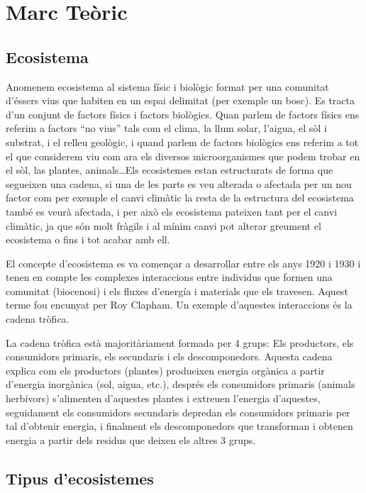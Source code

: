 \section{Marc Teòric}

\subsection{Ecosistema}
Anomenem ecosistema al sistema físic i biològic format per una comunitat d’éssers vius que habiten en un espai delimitat (per exemple un bosc). Es tracta d’un conjunt de factors físics i factors biològics. Quan parlem de factors físics ens referim a factors ``no vius'' tals com el clima, la llum solar, l’aigua, el sòl i substrat, i el relleu geològic, i quand parlem de factors biològics ens referim a tot el que considerem viu com ara els diversos microorganismes que podem trobar en el sòl, las plantes, animals\dots Els ecosistemes estan estructurats de forma que segueixen una cadena, si una de les parts es veu alterada o afectada per un nou factor com per exemple el canvi climàtic la resta de la estructura del ecosistema també es veurà afectada, i per això els ecosistema pateixen tant per el canvi climàtic, ja que són molt fràgils i al mínim canvi pot alterar greument el ecosistema o fins i tot acabar amb ell.

El concepte d’ecosistema es va començar a desarrollar entre els anys 1920 i 1930 i tenen en compte les complexes interaccions entre individus que formen una comunitat (biocenosi) i els fluxes d’energía i materials que els travesen. Aquest terme fou encunyat per Roy Clapham. Un exemple d’aquestes interaccions és la cadena tròfica.

La cadena tròfica està majoritàriament formada per 4 grups: Els productors, els consumidors primaris, els secundaris i els descomponedors. Aquesta cadena explica com els productors (plantes) produeixen energia orgànica a partir d’energia inorgànica (sol, aigua, etc.), després els consumidors primaris (animals herbívors) s’alimenten d’aquestes plantes i extreuen l’energia d’aquestes, seguidament els consumidors secundaris depredan els consumidors primaris per tal d’obtenir energia, i finalment els descomponedors que transforman i obtenen energia a partir dels residus que deixen els altres 3 grups.

\subsection{Tipus d’ecosistemes}

